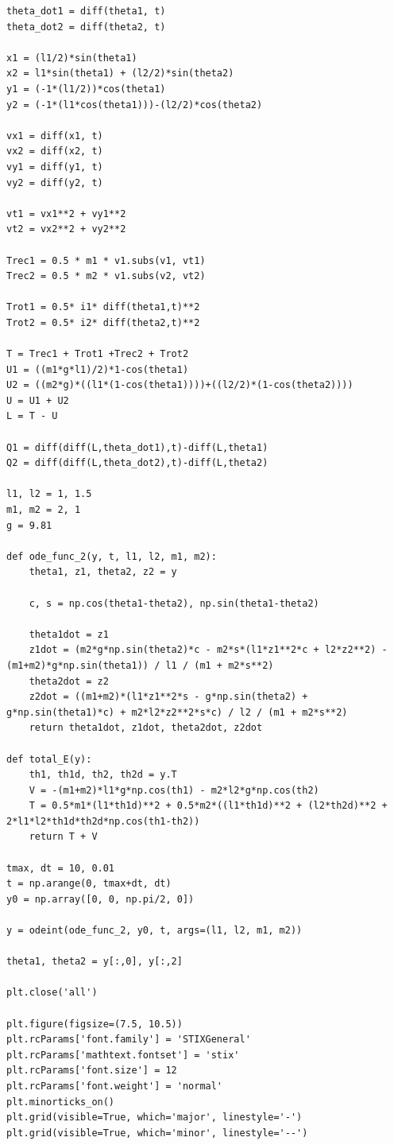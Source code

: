 \documentclass[12pt, a4paper]{article}
\begin{document}
\begin{verbatim}
theta_dot1 = diff(theta1, t)
theta_dot2 = diff(theta2, t)

x1 = (l1/2)*sin(theta1)
x2 = l1*sin(theta1) + (l2/2)*sin(theta2)
y1 = (-1*(l1/2))*cos(theta1)
y2 = (-1*(l1*cos(theta1)))-(l2/2)*cos(theta2)

vx1 = diff(x1, t)
vx2 = diff(x2, t)
vy1 = diff(y1, t)
vy2 = diff(y2, t)

vt1 = vx1**2 + vy1**2
vt2 = vx2**2 + vy2**2

Trec1 = 0.5 * m1 * v1.subs(v1, vt1)
Trec2 = 0.5 * m2 * v1.subs(v2, vt2)

Trot1 = 0.5* i1* diff(theta1,t)**2
Trot2 = 0.5* i2* diff(theta2,t)**2

T = Trec1 + Trot1 +Trec2 + Trot2
U1 = ((m1*g*l1)/2)*1-cos(theta1)
U2 = ((m2*g)*((l1*(1-cos(theta1))))+((l2/2)*(1-cos(theta2))))
U = U1 + U2
L = T - U

Q1 = diff(diff(L,theta_dot1),t)-diff(L,theta1)
Q2 = diff(diff(L,theta_dot2),t)-diff(L,theta2)

l1, l2 = 1, 1.5
m1, m2 = 2, 1
g = 9.81

def ode_func_2(y, t, l1, l2, m1, m2):
    theta1, z1, theta2, z2 = y

    c, s = np.cos(theta1-theta2), np.sin(theta1-theta2)

    theta1dot = z1
    z1dot = (m2*g*np.sin(theta2)*c - m2*s*(l1*z1**2*c + l2*z2**2) - (m1+m2)*g*np.sin(theta1)) / l1 / (m1 + m2*s**2)
    theta2dot = z2
    z2dot = ((m1+m2)*(l1*z1**2*s - g*np.sin(theta2) + g*np.sin(theta1)*c) + m2*l2*z2**2*s*c) / l2 / (m1 + m2*s**2)
    return theta1dot, z1dot, theta2dot, z2dot

def total_E(y):
    th1, th1d, th2, th2d = y.T
    V = -(m1+m2)*l1*g*np.cos(th1) - m2*l2*g*np.cos(th2)
    T = 0.5*m1*(l1*th1d)**2 + 0.5*m2*((l1*th1d)**2 + (l2*th2d)**2 + 2*l1*l2*th1d*th2d*np.cos(th1-th2))
    return T + V

tmax, dt = 10, 0.01
t = np.arange(0, tmax+dt, dt)
y0 = np.array([0, 0, np.pi/2, 0])

y = odeint(ode_func_2, y0, t, args=(l1, l2, m1, m2))

theta1, theta2 = y[:,0], y[:,2]

plt.close('all')

plt.figure(figsize=(7.5, 10.5))
plt.rcParams['font.family'] = 'STIXGeneral'
plt.rcParams['mathtext.fontset'] = 'stix'
plt.rcParams['font.size'] = 12
plt.rcParams['font.weight'] = 'normal'
plt.minorticks_on()
plt.grid(visible=True, which='major', linestyle='-')
plt.grid(visible=True, which='minor', linestyle='--')


\end{verbatim}
\end{document}

